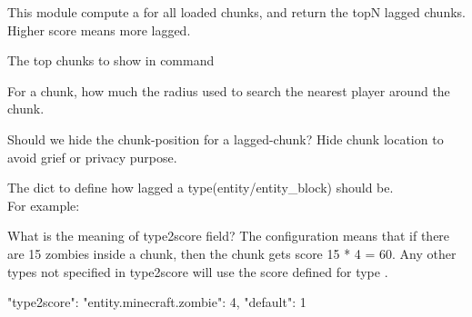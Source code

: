 This module compute a  for all loaded chunks, and return the topN lagged chunks.
Higher score means more lagged.


\begin{Configuration}
    \item[top]{
        The top chunks to show in  command
    }

    \item[nearest\_distance]{
        For a chunk, how much the radius used to search the nearest player around the chunk.
    }

    \item[hide\_location]{
        Should we hide the chunk-position for a lagged-chunk?
        Hide chunk location to avoid grief or privacy purpose.
    }

    \item[type2score]{
        The dict to define how lagged a type(entity/entity\_block) should be.\\
        For example:

        \begin{example}{What is the meaning of type2score field?}
            The configuration means that if there are 15 zombies inside a chunk, then the chunk gets score 15 * 4 = 60.
            Any other types not specified in type2score will use the score defined for type .

            \begin{json}
                "type2score": {
                    "entity.minecraft.zombie": 4,
                    "default": 1
                }
            \end{json}
        \end{example}
    }

\end{Configuration}